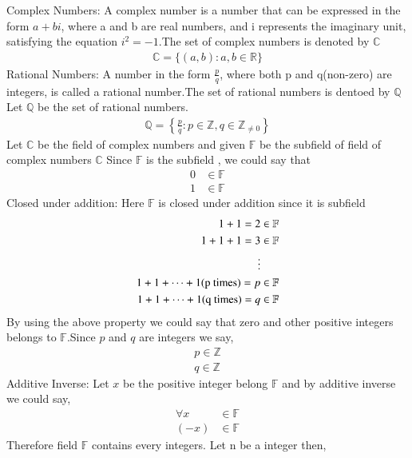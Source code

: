 
{Complex Numbers:}
A complex number is a number that can be expressed in the form $a + bi$, where a and b are real numbers, and i represents the imaginary unit, satisfying the equation $i^2 =-1$.The set of complex numbers is denoted by $\mathbb{C}$
\begin{align}
    \mathbb{C}=\{(a,b):a,b \in \mathbb{R}\}
\end{align}
{Rational Numbers:}
A number in the form $\frac{p}{q}$, where both p and q(non-zero) are integers, is called a rational number.The set of rational numbers is dentoed by $\mathbb{Q}$
Let $\mathbb{Q}$ be the set of rational numbers.
\begin{align}
    \mathbb{Q}=\left\{\frac{p}{q}:p \in \mathbb{Z},q \in \mathbb{Z}_{\not=0} \right\}\label{eq:solutions/1/1/7/q}
\end{align}
Let $\mathbb{C}$ be the field of complex numbers and given $\mathbb{F}$ be the subfield of field of complex numbers $\mathbb{C}$ 
Since $\mathbb{F}$ is the subfield , we could say that 
\begin{align}
    0 &\in \mathbb{F} \label{eq:solutions/1/1/7/0}\\
    1 &\in \mathbb{F}
\end{align}
{Closed under addition:}
Here $\mathbb{F}$ is closed under addition since it is subfield
\begin{align}
    1+1=2&\in \mathbb{F}\\
    1+1+1=3&\in \mathbb{F}\\
    \vdots\notag\\
    1+1+\dots+1\text{(p times)}= p &\in \mathbb{F}\label{eq:solutions/1/1/7/p}\\
    1+1+\dots+1\text{(q times)}= q &\in \mathbb{F}\label{eq:solutions/1/1/7/q1}
\end{align}
By using the above property we could say that zero and other positive integers belongs to $\mathbb{F}$.Since $p$ and $q$ are integers we say,
\begin{align}
    p \in \mathbb{Z}\\
    q \in \mathbb{Z}\label{eq:solutions/1/1/7/0}
\end{align}
{Additive Inverse:}
Let $x$ be the positive integer belong $\mathbb{F}$ and by additive inverse we could say, 
\begin{align}
    \forall x &\in \mathbb{F}\label{eq:solutions/1/1/7/1}\\
    (-x) &\in \mathbb{F} \label{eq:solutions/1/1/7/2}
\end{align}
Therefore field $\mathbb{F}$ contains every integers. Let n be a integer then,
